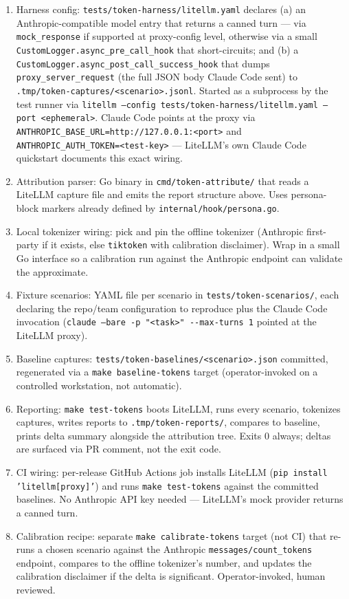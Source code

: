 \documentclass[a4paper,10pt]{article}
\newcommand{\pkg}[1]{\texttt{#1}}
\newcommand{\field}[1]{\texttt{#1}}
\newcommand{\cmd}[1]{\texttt{#1}}
\newcommand{\fpath}[1]{\texttt{#1}}
\begin{document}
\begin{enumerate}
  \item Harness config: \fpath{tests/token-harness/litellm.yaml}
    declares (a) an Anthropic-compatible model entry that returns a
    canned turn --- via \texttt{mock\_response} if supported at
    proxy-config level, otherwise via a small
    \pkg{CustomLogger.async\_pre\_call\_hook} that short-circuits;
    and (b) a \pkg{CustomLogger.async\_post\_call\_success\_hook}
    that dumps \field{proxy\_server\_request} (the full JSON body
    Claude Code sent) to
    \fpath{.tmp/token-captures/<scenario>.jsonl}.  Started as a
    subprocess by the test runner via
    \cmd{litellm --config tests/token-harness/litellm.yaml --port <ephemeral>}.
    Claude Code points at the proxy via
    \texttt{ANTHROPIC\_BASE\_URL=http://127.0.0.1:<port>} and
    \texttt{ANTHROPIC\_AUTH\_TOKEN=<test-key>} --- LiteLLM's own
    Claude Code quickstart documents this exact wiring.
  \item Attribution parser: Go binary in \fpath{cmd/token-attribute/}
    that reads a LiteLLM capture file and emits the report structure
    above.  Uses persona-block markers already defined by
    \pkg{internal/hook/persona.go}.
  \item Local tokenizer wiring: pick and pin the offline tokenizer
    (Anthropic first-party if it exists, else \pkg{tiktoken} with
    calibration disclaimer).  Wrap in a small Go interface so a
    calibration run against the Anthropic endpoint can validate the
    approximate.
  \item Fixture scenarios: YAML file per scenario in
    \fpath{tests/token-scenarios/}, each declaring the repo/team
    configuration to reproduce plus the Claude Code invocation
    (\cmd{claude --bare -p "<task>" -{}-max-turns 1} pointed at the
    LiteLLM proxy).
  \item Baseline captures: \fpath{tests/token-baselines/<scenario>.json}
    committed, regenerated via a \cmd{make baseline-tokens} target
    (operator-invoked on a controlled workstation, not automatic).
  \item Reporting: \cmd{make test-tokens} boots LiteLLM, runs every
    scenario, tokenizes captures, writes reports to
    \fpath{.tmp/token-reports/}, compares to baseline, prints delta
    summary alongside the attribution tree.  Exits 0 always; deltas
    are surfaced via PR comment, not the exit code.
  \item CI wiring: per-release GitHub Actions job installs LiteLLM
    (\cmd{pip install 'litellm[proxy]'}) and runs
    \cmd{make test-tokens} against the committed baselines.  No
    Anthropic API key needed --- LiteLLM's mock provider returns
    a canned turn.
  \item Calibration recipe: separate \cmd{make calibrate-tokens}
    target (not CI) that re-runs a chosen scenario against the
    Anthropic \texttt{messages/count\_tokens} endpoint, compares to
    the offline tokenizer's number, and updates the calibration
    disclaimer if the delta is significant.  Operator-invoked, human
    reviewed.
\end{enumerate}
\end{document}
